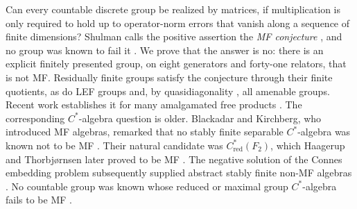\documentclass[11pt]{amsart}
\theoremstyle{definition}
\theoremstyle{remark}
\theoremstyle{plain}
\newcommand{\Cred}{C^*_{\mathrm{red}}}
\begin{document}
Can every countable discrete group be realized by matrices, if
multiplication is only required to hold up to operator-norm errors that
vanish along a sequence of finite dimensions?  Shulman calls the positive
assertion the \emph{MF conjecture} \cite{Shulman}, and no group was known
to fail it \cite{Schafhauser,Shulman}.  We prove that the answer is no:
there is an explicit finitely presented group, on eight generators and
forty-one relators, that is not MF\@.  Residually finite groups satisfy
the conjecture through their finite quotients, as do LEF groups \cite{CDE} and, by
quasidiagonality \cite{TWW}, all amenable groups.  Recent work
establishes it for many amalgamated free products
\cite{Schafhauser,Shulman,GKEMP}.
The corresponding $C^*$-algebra question is older.  Blackadar and
Kirchberg, who introduced MF algebras, remarked that no stably finite
separable $C^*$-algebra was known not to be MF \cite{BK,CDE}.  Their
natural candidate was $\Cred(F_2)$, which Haagerup and
Thorbj{\o}rnsen later proved to be MF \cite{HT}.  The negative solution of the Connes embedding
problem subsequently supplied abstract stably finite non-MF algebras
\cite{MIPRE,FGH}.  No countable group was known whose reduced or maximal group
$C^*$-algebra fails to be MF \cite{Shulman}.
\end{document}
